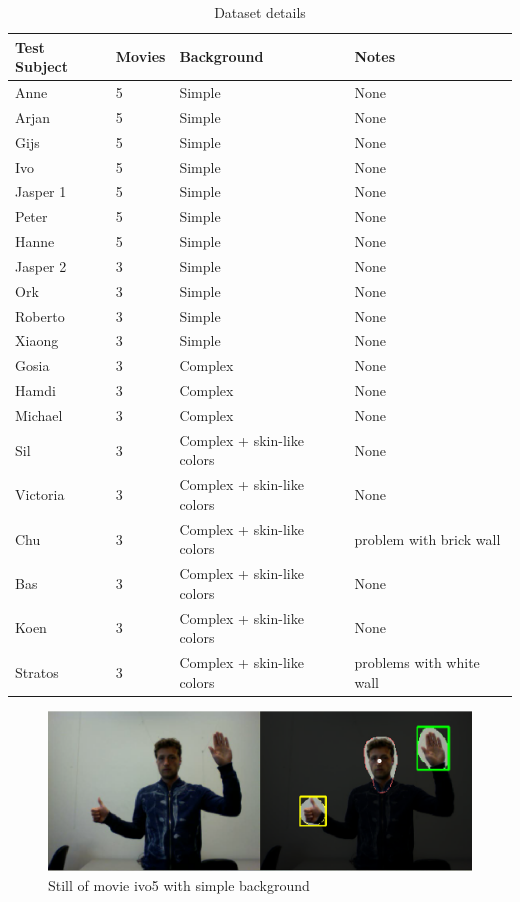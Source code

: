 \begin{table}
\centering
\begin{tabular}{llll}
\hline\hline
	Test Subject & Movies & Background & Notes \\
\hline
	Anne     & 5 & Simple & None \\
	Arjan    & 5 & Simple & None \\
	Gijs     & 5 & Simple & None \\
	Ivo      & 5 & Simple & None \\
	Jasper 1 & 5 & Simple & None \\
	Peter    & 5 & Simple & None \\
	Hanne    & 5 & Simple & None \\
	Jasper 2 & 3 & Simple & None \\
	Ork      & 3 & Simple & None \\
	Roberto  & 3 & Simple & None \\
	Xiaong   & 3 & Simple & None \\
	\hline			
	Gosia    & 3 & Complex & None \\
	Hamdi    & 3 & Complex & None \\
	Michael  & 3 & Complex & None \\
	Sil      & 3 & Complex + skin-like colors & None \\
	Victoria & 3 & Complex + skin-like colors & None \\
	Chu      & 3 & Complex + skin-like colors & problem with brick wall \\
	\hline	
	Bas      & 3 & Complex + skin-like colors & None \\
	Koen     & 3 & Complex + skin-like colors & None \\
	Stratos  & 3 & Complex + skin-like colors & problems with white wall \\
\hline
\end{tabular}
\caption{Dataset details}
\end{table}


\begin{figure}[htbp]
\center{}
\includegraphics[width=0.8\linewidth]{figures/simple.png}
\caption{Still of movie ivo5 with simple background}
\label{fig:simplebackground}
\end{figure}

